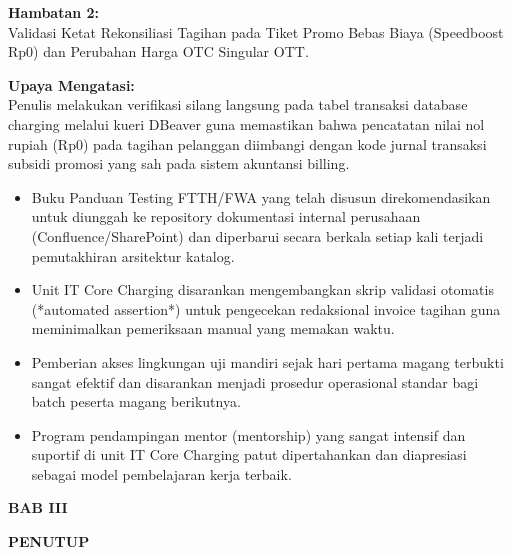 \documentclass[12pt,a4paper]{article}
\begin{document}
\vspace{0.3cm}
\noindent\textbf{Hambatan 2:}\\
Validasi Ketat Rekonsiliasi Tagihan pada Tiket Promo Bebas Biaya (Speedboost Rp0) dan Perubahan Harga OTC Singular OTT.\par
\vspace{0.1cm}
\noindent\textbf{Upaya Mengatasi:}\\
Penulis melakukan verifikasi silang langsung pada tabel transaksi database charging melalui kueri DBeaver guna memastikan bahwa pencatatan nilai nol rupiah (Rp0) pada tagihan pelanggan diimbangi dengan kode jurnal transaksi subsidi promosi yang sah pada sistem akuntansi billing.

\vspace{0.4cm}
\vspace{0.1cm}
\begin{itemize}[label=\textbullet,leftmargin=1.5em,itemsep=2pt,topsep=1pt]
    \item Buku Panduan Testing FTTH/FWA yang telah disusun direkomendasikan untuk diunggah ke repository dokumentasi internal perusahaan (Confluence/SharePoint) dan diperbarui secara berkala setiap kali terjadi pemutakhiran arsitektur katalog.
    \item Unit IT Core Charging disarankan mengembangkan skrip validasi otomatis (*automated assertion*) untuk pengecekan redaksional invoice tagihan guna meminimalkan pemeriksaan manual yang memakan waktu.
    \item Pemberian akses lingkungan uji mandiri sejak hari pertama magang terbukti sangat efektif dan disarankan menjadi prosedur operasional standar bagi batch peserta magang berikutnya.
    \item Program pendampingan mentor (mentorship) yang sangat intensif dan suportif di unit IT Core Charging patut dipertahankan dan diapresiasi sebagai model pembelajaran kerja terbaik.
\end{itemize}

\clearpage
\begin{center}
    {\bfseries\large BAB III\par}
    {\bfseries\large PENUTUP\par}
\end{center}
\vspace{0.3cm}
\end{document}
